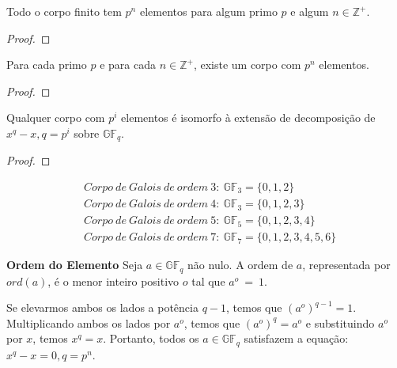 \begin{proposition}
Todo o corpo finito tem $p^n$ elementos para algum primo $p$ e algum $n \in \mathbb{Z}^+$.
\end{proposition}

\begin{proof}
\end{proof}

\begin{proposition}
Para cada primo $p$ e para cada  $n \in \mathbb{Z}^+$, existe um corpo com $p^n$ elementos.
\end{proposition}

\begin{proof}
\end{proof}

\begin{proposition}
Qualquer corpo com $p^i$ elementos é isomorfo à extensão de decomposição de $x^q - x, q = p^i$ sobre $\mathbb{GF}_q$.
\end{proposition}

\begin{proof}
\end{proof}

\begin{example}
\begin{align*}
& Corpo\ de\ Galois\ de\ ordem\ 3:\ \mathbb{GF}_3 = \{0, 1, 2\}\\
& Corpo\ de\ Galois\ de\ ordem\ 4:\ \mathbb{GF}_3 = \{0, 1, 2, 3\}\\
& Corpo\ de\ Galois\ de\ ordem\ 5:\ \mathbb{GF}_5 = \{0, 1, 2, 3, 4\}\\
& Corpo\ de\ Galois\ de\ ordem\ 7:\ \mathbb{GF}_7 = \{0, 1, 2, 3, 4, 5, 6\}
\end{align*}
\end{example}

\begin{definition} {\bf Ordem do Elemento} \label{OrdElem}  Seja $a \in \mathbb{GF}_q$ não nulo. A ordem de $a$, representada por $ord(a)$, é o menor inteiro positivo $o$ tal que $a^o\ =\ 1$.
\end{definition}

\begin{property} Se elevarmos ambos os lados a potência $q - 1$, temos que $(a^o)^{q - 1} = 1$. Multiplicando ambos os lados por $a^o$, temos que $(a^o)^q = a^o$ e substituindo $a^o$ por $x$, temos $x^q = x$. Portanto, todos os $a \in \mathbb{GF}_q$ satisfazem a equação: $x^q - x = 0, q = p^n$.
\end{property}

